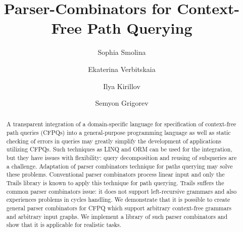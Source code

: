 \documentclass[sigconf]{acmart}
\begin{document}
\title{Parser-Combinators for Context-Free Path Querying}


\author{Sophia Smolina}

\author{Ekaterina Verbitskaia}

\author{Ilya Kirillov}

\author{Semyon Grigorev}

\renewcommand{\shortauthors}{Smolina et al.}

\begin{abstract}
A transparent integration of a domain-specific language for specification of context-free path queries (CFPQs) into a general-purpose programming language as well as static checking of errors in queries may greatly simplify the development of applications utilizing CFPQs.  
Such techniques as LINQ and ORM can be used for the integration, but they have issues with flexibility: query decomposition and reusing of subqueries are a challenge.
Adaptation of parser combinators technique for paths querying may solve these problems. 
Conventional parser combinators process linear input and only the Trails library is known to apply this technique for path querying.
Trails suffers the common parser combinators issue: it does not support left-recursive grammars and also experiences problems in cycles handling.
We demonstrate that it is possible to create general parser combinators for CFPQ which support arbitrary context-free grammars and arbitrary input graphs.
We implement a library of such parser combinators and show that it is applicable for realistic tasks.
\end{abstract}
\end{document}
